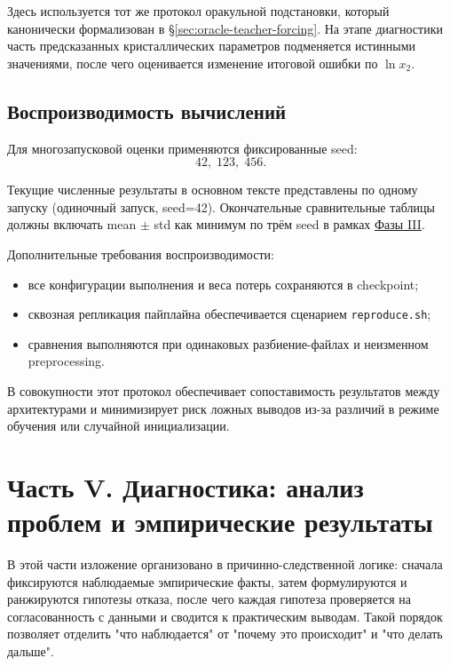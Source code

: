 \documentclass[11pt]{article}
\begin{document}
Здесь используется тот же протокол оракульной подстановки, который канонически формализован в §\ref{sec:oracle-teacher-forcing}. На этапе диагностики часть предсказанных кристаллических параметров подменяется истинными значениями, после чего оценивается изменение итоговой ошибки по $\ln x_2$.

\subsection{Воспроизводимость вычислений}

Для многозапусковой оценки применяются фиксированные seed:
\begin{equation*}
42,\; 123,\; 456.
\end{equation*}

Текущие численные результаты в основном тексте представлены по одному запуску (одиночный запуск, seed=42). Окончательные сравнительные таблицы должны включать mean $\pm$ std как минимум по трём seed в рамках \hyperref[subsec:roadmap-phase3]{Фазы III}.

Дополнительные требования воспроизводимости:
\begin{itemize}
  \item все конфигурации выполнения и веса потерь сохраняются в checkpoint;
  \item сквозная репликация пайплайна обеспечивается сценарием \texttt{reproduce.sh};
  \item сравнения выполняются при одинаковых разбиение-файлах и неизменном preprocessing.
\end{itemize}

В совокупности этот протокол обеспечивает сопоставимость результатов между архитектурами и минимизирует риск ложных выводов из-за различий в режиме обучения или случайной инициализации.


\section*{Часть V. Диагностика: анализ проблем и эмпирические результаты}

В этой части изложение организовано в причинно-следственной логике: сначала фиксируются наблюдаемые эмпирические факты, затем формулируются и ранжируются гипотезы отказа, после чего каждая гипотеза проверяется на согласованность с данными и сводится к практическим выводам. Такой порядок позволяет отделить "что наблюдается" от "почему это происходит" и "что делать дальше".
\end{document}
